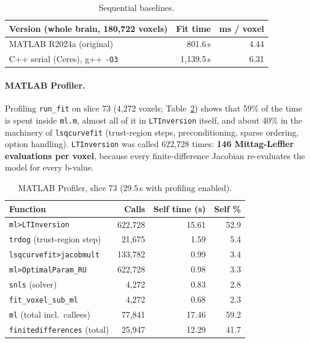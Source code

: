 \documentclass[11pt]{article}
\begin{document}
\begin{table}[htbp]
\centering
\begin{tabular}{lrr}
\toprule
Version (whole brain, 180,722 voxels) & Fit time & ms / voxel \\
\midrule
MATLAB R2024a (original) & 801.6\,s & 4.44 \\
C++ serial (Ceres), g++ \texttt{-O3} & 1,139.5\,s & 6.31 \\
\bottomrule
\end{tabular}
\caption{Sequential baselines.}
\label{tab:seq}
\end{table}

\paragraph{MATLAB Profiler.} Profiling \texttt{run\_fit} on slice 73 (4,272 voxels;
Table~\ref{tab:matlab-prof}) shows that 59\% of the time is spent inside \texttt{ml.m}, almost
all of it in \texttt{LTInversion} itself, and about 40\% in the machinery of
\texttt{lsqcurvefit} (trust-region steps, preconditioning, sparse ordering, option handling).
\texttt{LTInversion} was called 622,728 times: \textbf{146 Mittag-Leffler evaluations per voxel},
because every finite-difference Jacobian re-evaluates the model for every b-value.

\begin{table}[htbp]
\centering
\begin{tabular}{lrrr}
\toprule
Function & Calls & Self time (s) & Self \% \\
\midrule
\texttt{ml>LTInversion} & 622,728 & 15.61 & 52.9 \\
\texttt{trdog} (trust-region step) & 21,675 & 1.59 & 5.4 \\
\texttt{lsqcurvefit>jacobmult} & 133,782 & 0.99 & 3.4 \\
\texttt{ml>OptimalParam\_RU} & 622,728 & 0.98 & 3.3 \\
\texttt{snls} (solver) & 4,272 & 0.83 & 2.8 \\
\texttt{fit\_voxel\_sub\_ml} & 4,272 & 0.68 & 2.3 \\
\midrule
\texttt{ml} (total incl.\ callees) & 77,841 & 17.46 & 59.2 \\
\texttt{finitedifferences} (total) & 25,947 & 12.29 & 41.7 \\
\bottomrule
\end{tabular}
\caption{MATLAB Profiler, slice 73 (29.5\,s with profiling enabled).}
\label{tab:matlab-prof}
\end{table}
\end{document}
